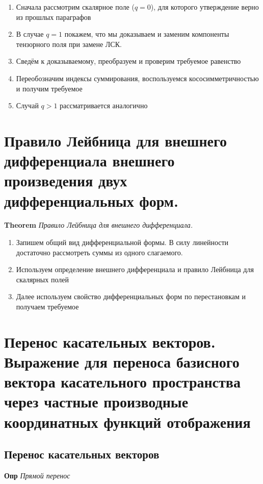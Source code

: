 \documentclass[a4paper, 14pt]{article}
\begin{document}
    \begin{enumerate}
        \item Сначала рассмотрим скалярное поле ($q = 0$), для которого утверждение верно из прошлых параграфов
        \item В случае $q = 1$ покажем, что мы доказываем и заменим компоненты тензорного поля при замене ЛСК.
        \item Сведём к доказываемому, преобразуем и проверим требуемое равенство
        \item Переобозначим индексы суммирования, воспользуемся кососимметричностью и получим требуемое
        \item Случай $q > 1$ рассматривается аналогично
    \end{enumerate}
    
    \section{Правило Лейбница для внешнего дифференциала внешнего произведения двух дифференциальных форм.}
    
    \textbf{Theorem} \textit{Правило Лейбница для внешнего дифференциала.}
    
    \begin{enumerate}
        \item Запишем общий вид дифференциальной формы.
        В силу линейности достаточно рассмотреть суммы из одного слагаемого.
        \item Используем определение внешнего дифференциала и правило Лейбница для скалярных полей
        \item Далее используем свойство дифференциальных форм по перестановкам и получаем требуемое
    \end{enumerate}
    
    \section{Перенос касательных векторов.
    Выражение для переноса базисного вектора касательного пространства через частные производные координатных функций
    отображения}
    
    \subsection{Перенос касательных векторов}
    
    \textbf{Опр} \textit{Прямой перенос}
    
\end{document}
